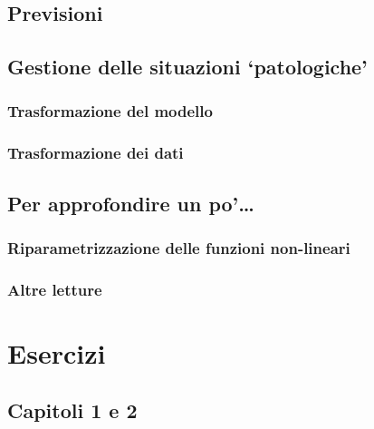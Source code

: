 \documentclass[a4paper,12pt,oneside]{book}
\begin{document}
\hypertarget{previsioni-1}{%
\section{Previsioni}\label{previsioni-1}}

\hypertarget{gestione-delle-situazioni-patologiche}{%
\section{Gestione delle situazioni `patologiche'}\label{gestione-delle-situazioni-patologiche}}

\hypertarget{trasformazione-del-modello}{%
\subsection{Trasformazione del modello}\label{trasformazione-del-modello}}

\hypertarget{trasformazione-dei-dati}{%
\subsection{Trasformazione dei dati}\label{trasformazione-dei-dati}}

\hypertarget{per-approfondire-un-po-5}{%
\section{Per approfondire un po'\ldots{}}\label{per-approfondire-un-po-5}}

\hypertarget{riparametrizzazione-delle-funzioni-non-lineari}{%
\subsection{Riparametrizzazione delle funzioni non-lineari}\label{riparametrizzazione-delle-funzioni-non-lineari}}

\hypertarget{altre-letture-8}{%
\subsection{Altre letture}\label{altre-letture-8}}

\hypertarget{esercizi}{%
\chapter{Esercizi}\label{esercizi}}

\hypertarget{capitoli-1-e-2}{%
\section{Capitoli 1 e 2}\label{capitoli-1-e-2}}
\end{document}
